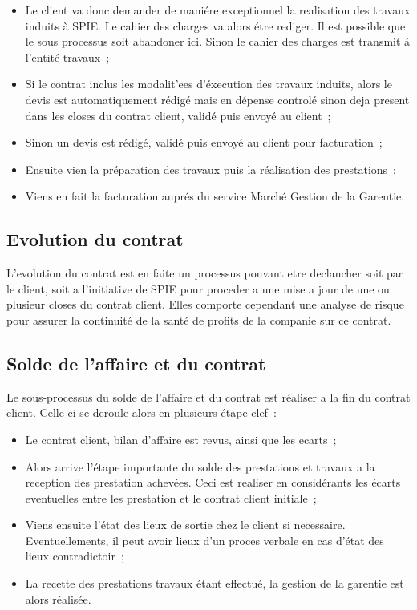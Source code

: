 \begin{itemize}
    \item Le client va donc demander de mani\'ere exceptionnel la realisation des travaux induits à SPIE\@. Le cahier des charges va alors \'etre rediger. Il est possible que le sous processus soit abandoner ici. Sinon le cahier des charges est transmit \'a l'entit\'e travaux~;
    \item Si le contrat inclus les modalit'ees d'\'execution des travaux induits, alors le devis est
    automatiquement r\'edig\'e mais en d\'epense control\'e sinon deja present dans les closes du
    contrat client, valid\'e puis envoy\'e au client~;
    \item Sinon un devis est r\'edig\'e, valid\'e puis envoy\'e au client pour facturation~;
    \item Ensuite vien la pr\'eparation des travaux puis la r\'ealisation des prestations~;
    \item Viens en fait la facturation aupr\'es du service March\'e Gestion de la Garentie.
\end{itemize}

\subsection{Evolution du contrat}

L'evolution du contrat  est en faite un processus pouvant etre declancher soit par le client, soit
a l'initiative de SPIE pour proceder a une mise a jour de une ou plusieur closes du contrat client.
Elles comporte cependant une analyse de risque pour assurer la continuit\'e de la sant\'e de profits
de la companie sur ce contrat.


\subsection{Solde de l'affaire et du contrat}

Le sous-processus du solde de l'affaire et du contrat est r\'ealiser a la fin du contrat client. Celle
ci se deroule alors en plusieurs \'etape clef~:

\begin{itemize}
    \item Le contrat client, bilan d'affaire est revus, ainsi que les ecarts~;
    \item Alors arrive l'\'etape importante du solde des prestations et travaux a la reception des
    prestation achev\'ees. Ceci est realiser en consid\'erants les \'ecarts eventuelles entre les
    prestation et le contrat client initiale~;
    \item Viens ensuite l'\'etat des lieux de sortie chez le client si necessaire. Eventuellements,
    il peut avoir lieux d'un proces verbale en cas d'\'etat des lieux contradictoir~;
    \item La recette des prestations travaux \'etant effectu\'e, la gestion de la garentie est alors
    r\'ealis\'ee.
\end{itemize}

